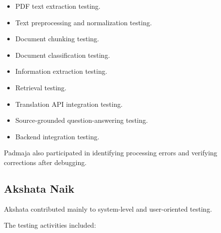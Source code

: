 \begin{itemize}

    \item PDF text extraction testing.

    \item Text preprocessing and normalization testing.

    \item Document chunking testing.

    \item Document classification testing.

    \item Information extraction testing.

    \item Retrieval testing.

    \item Translation API integration testing.

    \item Source-grounded question-answering testing.

    \item Backend integration testing.

\end{itemize}

Padmaja also participated in identifying processing errors and
verifying corrections after debugging.

\subsection{Akshata Naik}

Akshata contributed mainly to system-level and user-oriented testing.

The testing activities included:

